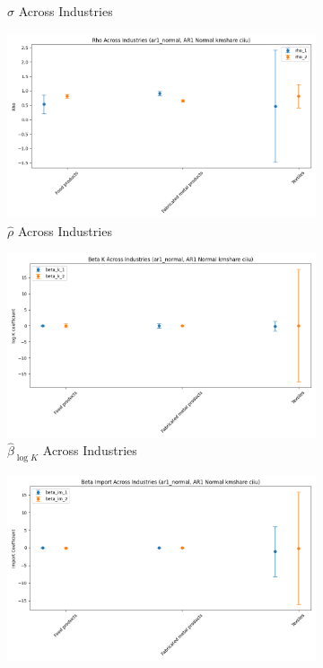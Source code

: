 \documentclass{article}
\begin{document}
\begin{figure}[ht!]
\begin{subfigure}[t]{0.32\textwidth}
        \caption{$\hat\sigma$ Across Industries}
    \end{subfigure}
    \begin{subfigure}[t]{0.32\textwidth}
        \centering
        \includegraphics[width=\textwidth]{figure/ar1_normal_kmshare_ciiu_rho_across_industries.png}
        \caption{$\hat\rho$ Across Industries}
    \end{subfigure}
    \begin{subfigure}[t]{0.32\textwidth}
        \centering
        \includegraphics[width=\textwidth]{figure/ar1_normal_kmshare_ciiu_beta_k_across_industries.png}
        \caption{$\hat{\beta}_{\log K}$ Across Industries}
    \end{subfigure}
    \begin{subfigure}[t]{0.32\textwidth}
        \centering
        \includegraphics[width=\textwidth]{figure/ar1_normal_kmshare_ciiu_beta_im_across_industries.png}

\end{subfigure}
\end{figure}
\end{document}
